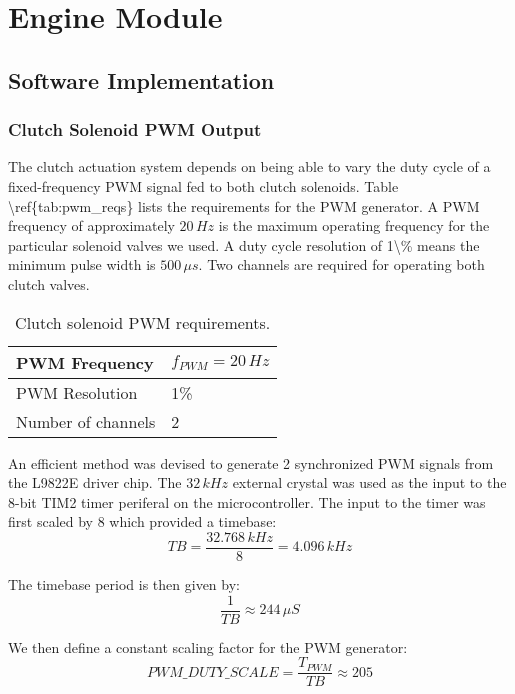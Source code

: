 \chapter{Engine Module}

\label{chap:engine}


\section{Software Implementation}


\subsection{Clutch Solenoid PWM Output}

The clutch actuation system depends on being able to vary the duty
cycle of a fixed-frequency PWM signal fed to both clutch solenoids.
Table \textbackslash{}ref\{tab:pwm\_reqs\} lists the requirements
for the PWM generator. A PWM frequency of approximately $20\, Hz$
is the maximum operating frequency for the particular solenoid valves
we used. A duty cycle resolution of 1\textbackslash{}\% means the
minimum pulse width is $500\,\mu s$. Two channels are required for
operating both clutch valves.

%
\begin{table}
\caption{Clutch solenoid PWM requirements.\label{tab:pwm_reqs}}


\centering{}\begin{tabular}{|l|l|}
\hline 
PWM Frequency  & $f_{PWM}=20\, Hz$\tabularnewline
\hline 
PWM Resolution  & 1\% \tabularnewline
\hline 
Number of channels  & 2 \tabularnewline
\hline
\end{tabular}
\end{table}


An efficient method was devised to generate 2 synchronized PWM signals
from the L9822E driver chip. The $32\, kHz$ external crystal was
used as the input to the 8-bit TIM2 timer periferal on the microcontroller.
The input to the timer was first scaled by 8 which provided a timebase:
\begin{equation}
TB=\frac{32.768\, kHz}{8}=4.096\, kHz\end{equation}


The timebase period is then given by: \begin{equation}
\frac{1}{TB}\approx244\,\mu{S}\end{equation}


We then define a constant scaling factor for the PWM generator: \begin{equation}
{PWM\_DUTY\_SCALE}=\frac{T_{PWM}}{TB}\approx205\end{equation}


